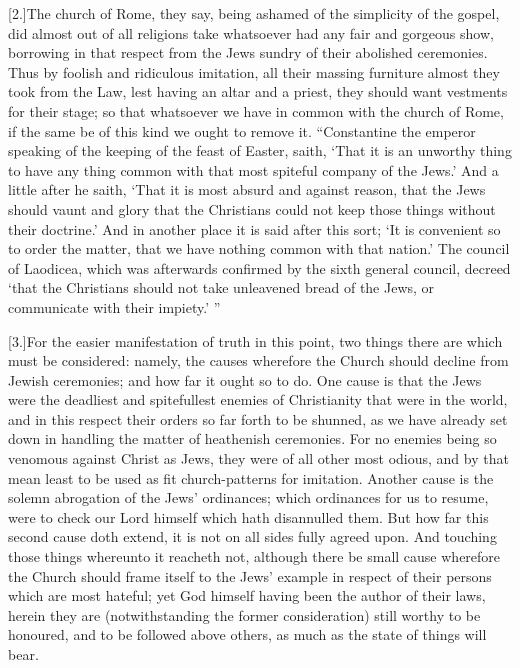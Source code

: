 [2.]The church of Rome, they say, being ashamed of the simplicity of the gospel, did almost out of all religions take whatsoever had any fair and gorgeous show, borrowing in that respect from the Jews sundry of their abolished ceremonies. Thus by foolish and ridiculous imitation, all their massing furniture almost they took from the Law, lest having an altar and a priest, they should want vestments for their stage; so that whatsoever we have in common with the church of Rome, if the same be of this kind we ought to remove it. “Constantine the emperor speaking of the keeping of the feast of Easter, saith, ‘That it is an unworthy thing to have any thing common with that most spiteful company of the Jews.’ And a little after he saith, ‘That it is most absurd and against reason, that the Jews should  vaunt and glory that the Christians could not keep those things without their doctrine.’ And in another place it is said after this sort; ‘It is convenient so to order the matter, that we have nothing common with that nation.’ The council of Laodicea, which was afterwards confirmed by the sixth general council, decreed ‘that the Christians should not take unleavened bread of the Jews, or communicate with their impiety.’ ”

[3.]For the easier manifestation of truth in this point, two things there are which must be considered: namely, the causes wherefore the Church should decline from Jewish ceremonies; and how far it ought so to do. One cause is that the Jews were the deadliest and spitefullest enemies of Christianity that were in the world, and in this respect their orders so far forth to be shunned, as we have already set down in handling the matter of heathenish ceremonies. For no enemies being so venomous against Christ as Jews, they were of all other most odious, and by that mean least to be used as fit church-patterns for imitation. Another cause is the solemn abrogation of the Jews’ ordinances; which ordinances for us to resume, were to check our Lord himself which hath disannulled them. But how far this second cause doth extend, it is not on all sides fully agreed upon. And touching those things whereunto it reacheth not, although there be small cause wherefore the Church should frame itself to the Jews’ example in respect of their persons which are most hateful; yet God himself having been the author of their laws, herein they are (notwithstanding the former consideration) still worthy to be honoured, and to be followed above others, as much as the state of things will bear.

